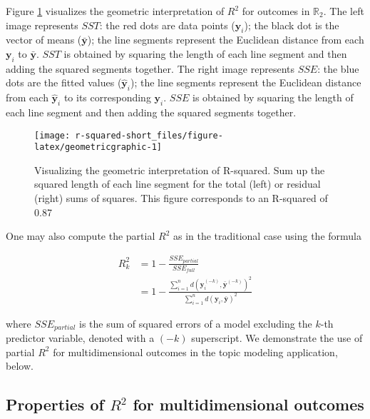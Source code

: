 Figure \ref{fig:geometricgraphic} visualizes the geometric interpretation of \(R^2\) for outcomes in \(\mathbb{R}_2\). The left image represents \(SST\): the red dots are data points (\(\boldsymbol{y}_i\)); the black dot is the vector of means (\(\bar{\boldsymbol{y}}\)); the line segments represent the Euclidean distance from each \(\boldsymbol{y}_i\) to \(\bar{\boldsymbol{y}}\). \(SST\) is obtained by squaring the length of each line segment and then adding the squared segments together. The right image represents \(SSE\): the blue dots are the fitted values (\(\hat{\boldsymbol{y}}_i\)); the line segments represent the Euclidean distance from each \(\hat{\boldsymbol{y}}_i\) to its corresponding \(\boldsymbol{y}_i\). \(SSE\) is obtained by squaring the length of each line segment and then adding the squared segments together.

\begin{figure}
\texttt{[image: r-squared-short\_files/figure-latex/geometricgraphic-1]} \caption{Visualizing the geometric interpretation of R-squared. Sum up the squared length of each line segment for the total (left) or residual (right) sums of squares. This figure corresponds to an R-squared of 0.87}\label{fig:geometricgraphic}
\end{figure}

One may also compute the partial \(R^2\) as in the traditional case using the formula

\begin{align}
    R^2_{k} &= 1 - \frac{SSE_{partial}}{SSE_{full}}\\
        &= 1 - \frac{\sum_{i=1}^n d(\boldsymbol{y}_i^{(-k)},\bar{\boldsymbol{y}}^{(-k)})^2}{\sum_{i=1}^n d(\boldsymbol{y}_i,\bar{\boldsymbol{y}})^2}
\end{align}

where \(SSE_{partial}\) is the sum of squared errors of a model excluding the \(k\)-th predictor variable, denoted with a \((-k)\) superscript. We demonstrate the use of partial \(R^2\) for multidimensional outcomes in the topic modeling application, below.

\hypertarget{properties-of-r2-for-multidimensional-outcomes}{%
\subsection{\texorpdfstring{Properties of \(R^2\) for multidimensional outcomes}{Properties of R\^{}2 for multidimensional outcomes}}\label{properties-of-r2-for-multidimensional-outcomes}}

